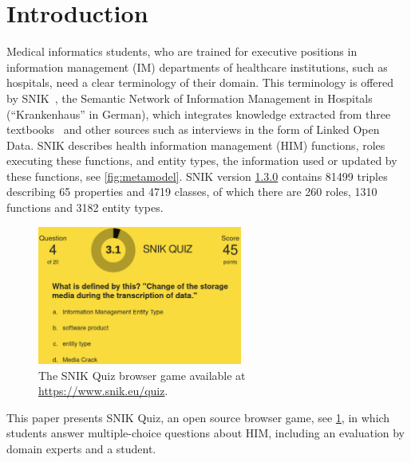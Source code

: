 \documentclass{IOS-Book-Article}     %
\newcommand{\citep}{\cite}%
\newcommand{\snikversion}{1.3.0}
\newcommand{\snikversionlink}{\href{https://github.com/snikproject/ontology/releases/tag/\snikversion}{\snikversion}}
\newcommand{\sniktriples}{\num{81499}}
\newcommand{\snikclasses}{\num{4719}}
\newcommand{\snikroles}{260}
\newcommand{\snikfunctions}{\num{1310}}
\newcommand{\snikentitytypes}{\num{3182}}
\newcommand{\snikproperties}{65}
\begin{document}
\section{Introduction}
Medical informatics students, who are trained for executive positions in information management (IM) departments of healthcare institutions, such as hospitals, need a clear terminology of their domain.
This terminology is offered by SNIK~\citep{semantischesnetz,sniktec}, the Semantic Network of Information Management in Hospitals (\enquote{Krankenhaus} in German), which integrates knowledge extracted from three textbooks~\citep{bb,ob,he} and other sources such as interviews in the form of Linked Open Data.
SNIK describes health information management (HIM) functions, roles executing these functions, and entity types, the information used or updated by these functions, see \cref{fig:metamodel}.
SNIK version \snikversionlink{} contains \sniktriples{} triples describing \snikproperties{} properties and \snikclasses{} classes, of which there are \snikroles{} roles, \snikfunctions{} functions and \snikentitytypes{} entity types.
%
\begin{figure}
\caption{The SNIK Quiz browser game available at \url{https://www.snik.eu/quiz}.}
\label{fig:snikquiz}
\centering
\includegraphics[width=0.6\textwidth]{img/snik-quiz.png}
\end{figure}
This paper presents SNIK Quiz, an open source\footnotemark{} browser game, see \cref{fig:snikquiz}, in which students answer multiple-choice questions about HIM, including an evaluation by domain experts and a student.
\end{document}
